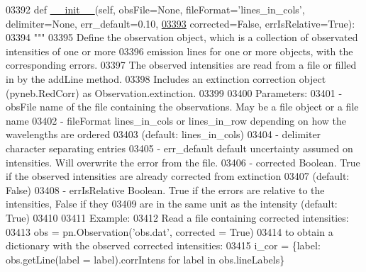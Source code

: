 \begin{DoxyCode}
{{{{{{{{{{{{{{{{{{{{{{03392     \textcolor{keyword}{def }\hyperlink{classpyneb_1_1core_1_1pynebcore_1_1_observation_a4f72b542ac93dd5376e05c7c44015409}{\_\_init\_\_}(self, obsFile=None, fileFormat='lines\_in\_cols', delimiter=None, err\_default=0.10,
\hypertarget{pynebcore_8py_source_l03393}{}\hyperlink{classpyneb_1_1core_1_1pynebcore_1_1_observation_a4f72b542ac93dd5376e05c7c44015409}{03393}                  corrected=\textcolor{keyword}{False}, errIsRelative=\textcolor{keyword}{True}):
03394         \textcolor{stringliteral}{"""}
03395 \textcolor{stringliteral}{        Define the observation object, which is a collection of observated intensities of one or more}
03396 \textcolor{stringliteral}{        emission lines for one or more objects, with the corresponding errors.}
03397 \textcolor{stringliteral}{        The observed intensities are read from a file or filled in by the addLine method.}
03398 \textcolor{stringliteral}{        Includes an extinction correction object (pyneb.RedCorr) as Observation.extinction.}
03399 \textcolor{stringliteral}{        }
03400 \textcolor{stringliteral}{        Parameters:}
03401 \textcolor{stringliteral}{            - obsFile       name of the file containing the observations. May be a file object or a file
       name }
03402 \textcolor{stringliteral}{            - fileFormat    lines\_in\_cols or lines\_in\_row depending on how the wavelengths are ordered }
03403 \textcolor{stringliteral}{                                (default: lines\_in\_cols)}
03404 \textcolor{stringliteral}{            - delimiter     character separating entries }
03405 \textcolor{stringliteral}{            - err\_default   default uncertainty assumed on intensities. Will overwrite the error from the
       file.}
03406 \textcolor{stringliteral}{            - corrected     Boolean. True if the observed intensities are already corrected from extinction}
03407 \textcolor{stringliteral}{                                (default: False)}
03408 \textcolor{stringliteral}{            - errIsRelative Boolean. True if the errors are relative to the intensities, False if they}
03409 \textcolor{stringliteral}{                                are in the same unit as the intensity (default: True)}
03410 \textcolor{stringliteral}{}
03411 \textcolor{stringliteral}{        Example:}
03412 \textcolor{stringliteral}{            Read a file containing corrected intensities:}
03413 \textcolor{stringliteral}{                obs = pn.Observation('obs.dat', corrected = True)}
03414 \textcolor{stringliteral}{            to obtain a dictionary with the observed  corrected intensities:}
03415 \textcolor{stringliteral}{                i\_cor = \{label: obs.getLine(label = label).corrIntens for label in obs.lineLabels\}}
}}}}}}}}}}}}}}}}}}}}}}
\end{DoxyCode}
